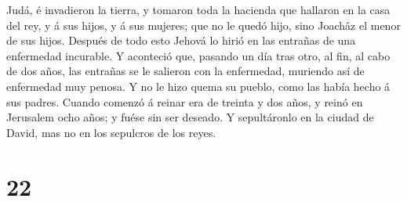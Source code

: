 Judá, é invadieron la tierra, y tomaron toda la hacienda que hallaron en
la casa del rey, y á sus hijos, y á sus mujeres; que no le quedó hijo,
sino Joachâz el menor de sus hijos.  Después de todo esto
Jehová lo hirió en las entrañas de una enfermedad incurable.
 Y aconteció que, pasando un día tras otro, al fin, al cabo
de dos años, las entrañas se le salieron con la enfermedad, muriendo así
de enfermedad muy penosa. Y no le hizo quema su pueblo, como las había
hecho á sus padres.  Cuando comenzó á reinar era de treinta
y dos años, y reinó en Jerusalem ocho años; y fuése sin ser deseado. Y
sepultáronlo en la ciudad de David, mas no en los sepulcros de los
reyes.

\hypertarget{section-21}{%
\section{22}\label{section-21}}

